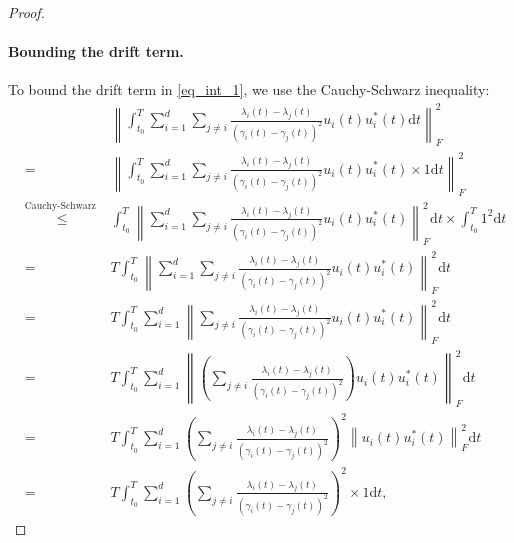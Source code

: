 \documentclass[11pt,letterpaper]{article}
\begin{document}
\begin{proof}
\paragraph{Bounding the drift term.}

To bound the drift term in \eqref{eq_int_1}, we use the Cauchy-Schwarz inequality:
%
\begin{eqnarray}
     & & \!\!\!\!\!\!\!\!\!\!\!\!\! \! \!  \! \! \!\!\!\!\!\!\!\!\!\!\!\!\!\!\!\! \! \! \! \! \!\!\!\!\!\!\!\!\!\!\!\!\!\!\!\! \! \!\!\!\!\!\!\!\!\!\!\!\!\!\!\!\! \! \!\!\!\!\!\!\!\!\!\!\!\!\!\!\! \left\|\int_{t_0}^{T}\sum_{i=1}^{d} \sum_{j\neq i}  \frac{\lambda_i(t) - \lambda_j(t)}{(\gamma_i(t) - \gamma_j(t))^2} u_i(t) u_i^\ast(t) \mathrm{d}t \right\|_F^2\nonumber \\
     & =  &    \left\|\int_{t_0}^{T}\sum_{i=1}^{d} \sum_{j\neq i}  \frac{\lambda_i(t) - \lambda_j(t)}{(\gamma_i(t) - \gamma_j(t))^2} u_i(t) u_i^\ast(t) \times 1 \mathrm{d}t \right\|_F^2 \nonumber\\ 
     &     \stackrel{\textrm{Cauchy-Schwarz Ineq.}}{\leq}&     \int_{t_0}^{T}\left\|\sum_{i=1}^{d} \sum_{j\neq i}  \frac{\lambda_i(t) - \lambda_j(t)}{(\gamma_i(t) - \gamma_j(t))^2} u_i(t) u_i^\ast(t)\right\|_F^2 \mathrm{d}t\times \int_{t_0}^{T} 1^2 \mathrm{d}t \label{eq_n127}\\
     &=&   T \int_{t_0}^{T}\left\|\sum_{i=1}^{d} \sum_{j\neq i} \frac{\lambda_i(t) - \lambda_j(t)}{(\gamma_i(t) - \gamma_j(t))^2} u_i(t) u_i^\ast(t) \right\|_F^2 \mathrm{d}t \nonumber \\
          &=&   T \int_{t_0}^{T}\sum_{i=1}^{d} \left\|\sum_{j\neq i} \frac{\lambda_i(t) - \lambda_j(t)}{(\gamma_i(t) - \gamma_j(t))^2} u_i(t) u_i^\ast(t) \right\|_F^2 \mathrm{d}t \label{eq_n128}\\
                    &=&   T \int_{t_0}^{T}\sum_{i=1}^{d} \left\|\left(\sum_{j\neq i} \frac{\lambda_i(t) - \lambda_j(t)}{(\gamma_i(t) - \gamma_j(t))^2}\right) u_i(t) u_i^\ast(t) \right\|_F^2 \mathrm{d}t \nonumber\\
                                        &=&   T \int_{t_0}^{T}\sum_{i=1}^{d}\left(\sum_{j\neq i} \frac{\lambda_i(t) - \lambda_j(t)}{(\gamma_i(t) - \gamma_j(t))^2}\right)^2 \left\| u_i(t) u_i^\ast(t) \right\|_F^2 \mathrm{d}t \nonumber\\
                                                                                &=&   T \int_{t_0}^{T}\sum_{i=1}^{d}\left(\sum_{j\neq i} \frac{\lambda_i(t) - \lambda_j(t)}{(\gamma_i(t) - \gamma_j(t))^2}\right)^2 \times 1 \mathrm{d}t, \label{eq_int_3}

\end{eqnarray}
\end{proof}
\end{document}
